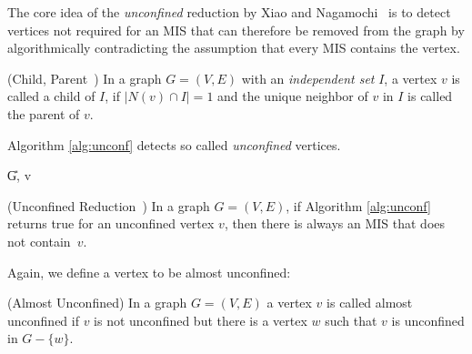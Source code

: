 \documentclass[a4paper,UKenglish,cleveref, autoref, thm-restate]{lipics-v2021}
\begin{document}
The core idea of the \emph{unconfined} reduction by Xiao and
Nagamochi~\cite{XiaoUnconfined} is to detect vertices not required for an MIS
that can therefore be removed from the graph by algorithmically
contradicting the assumption that every MIS contains the vertex.

\begin{definition} (Child, Parent~\cite{XiaoUnconfined}) In a graph $G=(V,E)$ with an \textit{independent set} $I$, a vertex $v$ is called a child of $I$, if $|N(v)\cap I| = 1$ and the unique neighbor of $v$ in $I$ is called the parent of $v$.
\end{definition}

Algorithm \ref{alg:unconf} detects so called \textit{unconfined}
vertices.

\begin{algorithm}[t]
	\caption{Unconfined -- Xiao and Nagamochi
      \cite{XiaoUnconfined}}\label{alg:unconf}
	\DontPrintSemicolon
	
	\U{G, v}	
	
	
\end{algorithm}


\begin{theorem}(Unconfined Reduction~\cite{XiaoUnconfined}) In a graph $G=(V,E)$,
  if Algorithm \ref{alg:unconf} returns true for an unconfined vertex $v$, then
  there is always an MIS that does not contain~$v$.
\end{theorem}

Again, we define a vertex to be almost unconfined:

\begin{definition} (Almost Unconfined)
  In a graph $G=(V,E)$ a vertex $v$ is called almost unconfined if $v$ is not unconfined but there is a vertex $w$ such that $v$ is unconfined in $G-\{w\}$.
\end{definition}
\end{document}
